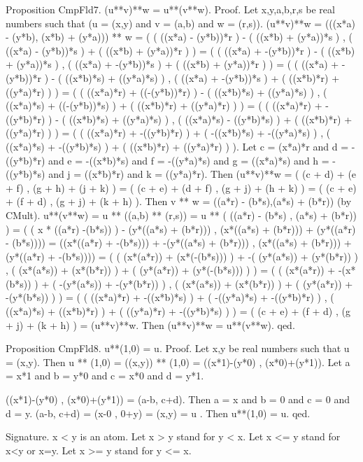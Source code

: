 \documentclass{article}
\newenvironment{forthel}{\begin{leftbar}}{\end{leftbar}}
\begin{document}
\begin{forthel}
Proposition CmpFld7. (u**v)**w = u**(v**w).
Proof. Let x,y,a,b,r,s be real numbers such that (u = (x,y) and v = (a,b) and w = (r,s)). 
(u**v)**w = (((x*a) - (y*b), (x*b) + (y*a))) ** w 
= (  ( ((x*a)  - (y*b))*r ) - ( ((x*b) + (y*a))*s )  ,  ( ((x*a)  - (y*b))*s ) + ( ((x*b) + (y*a))*r ) )
= (  ( ((x*a) + -(y*b))*r ) - ( ((x*b) + (y*a))*s )  ,  ( ((x*a) + -(y*b))*s ) + ( ((x*b) + (y*a))*r ) )
= (  ( ((x*a) + -(y*b))*r ) - ( ((x*b)*s) + ((y*a)*s) )  ,  ( ((x*a) + -(y*b))*s ) + ( ((x*b)*r) + ((y*a)*r) )  )
= (  ( ((x*a)*r) + ((-(y*b))*r) ) - ( ((x*b)*s) + ((y*a)*s) )  ,  ( ((x*a)*s) + ((-(y*b))*s) ) + ( ((x*b)*r) + ((y*a)*r) )  ) 
= (  ( ((x*a)*r) + -((y*b)*r) ) - ( ((x*b)*s) + ((y*a)*s) )  ,  ( ((x*a)*s) - ((y*b)*s) ) + ( ((x*b)*r) + ((y*a)*r) )  )
= (  ( ((x*a)*r) + -((y*b)*r) ) + ( -((x*b)*s) + -((y*a)*s) )  ,  ( ((x*a)*s) + -((y*b)*s) ) + ( ((x*b)*r) + ((y*a)*r) )  ).
Let c = (x*a)*r and d = -((y*b)*r) and e = -((x*b)*s) and f = -((y*a)*s) and g = ((x*a)*s) and  h = -((y*b)*s) and  j = ((x*b)*r) and k = ((y*a)*r).
Then (u**v)**w =  ( (c + d) + (e  + f) , (g + h) +  (j + k)  )
=  ( (c + e) + (d + f) , (g +  j) + (h  + k) )
= ( (c + e) + (f + d) , (g + j) + (k + h) ).
Then v ** w = ((a*r) - (b*s),(a*s) + (b*r)) (by CMult).
u**(v**w) = u ** ((a,b) ** (r,s)) 
= u ** (  ((a*r) - (b*s) , (a*s) + (b*r))  )
= (  ( x * ((a*r) -(b*s)) ) - (y*((a*s) + (b*r))) , (x*((a*s) + (b*r))) + (y*((a*r) - (b*s))))
= ((x*((a*r) + -(b*s))) + -(y*((a*s) + (b*r))) , (x*((a*s) 	+ (b*r))) + (y*((a*r) + -(b*s))))
= (  ( (x*(a*r)) + (x*(-(b*s))) ) + -( (y*(a*s)) + (y*(b*r)) )  , ( (x*(a*s)) + (x*(b*r)) ) + ( (y*(a*r)) + (y*(-(b*s))) ) )
= (  ( (x*(a*r)) + -(x*(b*s)) ) + ( -(y*(a*s)) + -(y*(b*r)) )  ,  ( (x*(a*s)) + (x*(b*r)) ) + ( (y*(a*r)) + -(y*(b*s)) ) )
= (  ( ((x*a)*r) + -((x*b)*s) ) + ( -((y*a)*s) + -((y*b)*r) )  ,  ( ((x*a)*s) + ((x*b)*r) ) + ( ((y*a)*r) + -((y*b)*s) ) )
= ( (c + e) + (f + d) , (g + j) + (k + h) ) = (u**v)**w.
Then (u**v)**w = u**(v**w). qed.


Proposition CmpFld8. u**(1,0) = u.
Proof. Let x,y be real numbers such that u = (x,y). Then u ** (1,0) = ((x,y)) ** (1,0) = ((x*1)-(y*0) , (x*0)+(y*1)). 
Let a = x*1 and b = y*0 and c = x*0 and d = y*1.

((x*1)-(y*0) , (x*0)+(y*1)) = (a-b, c+d).
Then a = x and b = 0 and c = 0 and d = y.
(a-b, c+d) = (x-0 , 0+y) = (x,y) = u .
Then u**(1,0) = u.
qed.






Signature. x < y is an atom.
Let x > y stand for y < x.
Let x <= y stand for x<y or x=y.
Let x >= y stand for y <= x.


\end{forthel}
\end{document}
